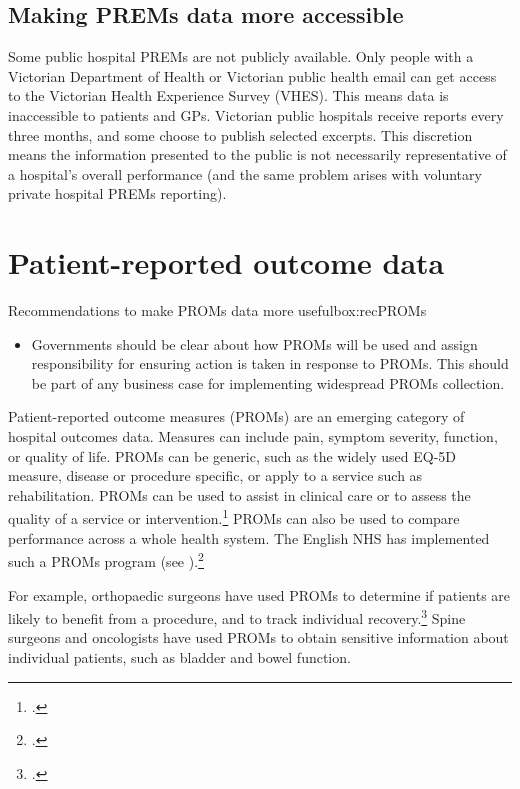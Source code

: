 \documentclass[FrontPage]{grattan}
\begin{document}
\subsection{Making PREMs data more accessible}\label{subsec:PREMsaccess}
Some public hospital PREMs are not publicly available. Only people with a Victorian Department of Health or Victorian public health email can get access to the Victorian Health Experience Survey (VHES). This means data is inaccessible to patients and GPs. Victorian public hospitals receive reports every three months, and some choose to publish selected excerpts. This discretion means the information presented to the public is not necessarily representative of a hospital’s overall performance (and the same problem arises with voluntary private hospital PREMs reporting).

\section{Patient-reported outcome data}\label{sec:PROMs}
\begin{addsmallbox}{Recommendations to make PROMs data more useful}{box:recPROMs}
\begin{itemize}[leftmargin=*]
    \item Governments should be clear about how PROMs will be used and assign responsibility for ensuring action is taken in response to PROMs. This should be part of any business case for implementing widespread PROMs collection.
\end{itemize}
\end{addsmallbox}


Patient-reported outcome measures (PROMs) are an emerging category of hospital outcomes data. Measures can include pain, symptom severity, function, or quality of life. PROMs can be generic, such as the widely used EQ-5D measure, disease or procedure specific, or apply to a service such as rehabilitation. PROMs can be used to assist in clinical care or to assess the quality of a service or intervention.\footcite{RN64}
PROMs can also be used to compare performance across a whole health system. The English NHS has implemented such a PROMs program (see ).\footcite{devlin2010patient}

For example, orthopaedic surgeons have used PROMs to determine if patients are likely to benefit from a procedure, and to track individual recovery.\footcites{RN67}{RN66}{RN65}
Spine surgeons and oncologists have used PROMs to obtain sensitive information about individual patients, such as bladder and bowel function.
\end{document}
